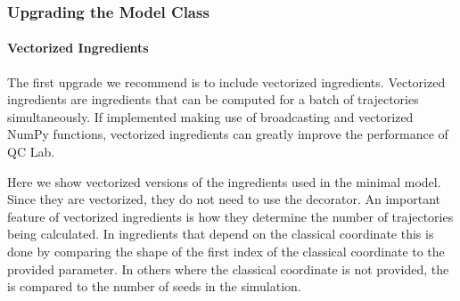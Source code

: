 \documentclass[letterpaper,10pt,english]{sphinxmanual}
\begin{document}
\begin{sphinxVerbatim}[commandchars=\\\{\}]
        
          \PYG{p}{[}\PYG{p}{]}
          
             
\end{sphinxVerbatim}


\subsubsection{Upgrading the Model Class}
\label{\detokenize{user_guide/model_dev:upgrading-the-model-class}}

\paragraph{Vectorized Ingredients}
\label{\detokenize{user_guide/model_dev:vectorized-ingredients}}
\sphinxAtStartPar
The first upgrade we recommend is to include vectorized ingredients. Vectorized ingredients are ingredients that can be computed for a batch of
trajectories simultaneously. If implemented making use of broadcasting and vectorized NumPy functions, vectorized ingredients can greatly improve
the performance of QC Lab.

\sphinxAtStartPar
Here we show vectorized versions of the ingredients used in the minimal model. Since they are vectorized, they do not need to use the 
decorator. An important feature of vectorized ingredients is how they determine the number of trajectories being calculated. In ingredients that depend on the classical coordinate
this is done by comparing the shape of the first index of the classical coordinate to the provided  parameter. In others where the classical coordinate is not
provided, the  is compared to the number of seeds in the simulation.
\end{document}

